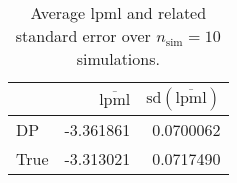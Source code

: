 \begin{table}[H]

\caption{Average lpml and related standard error over $n_{\text{sim}} = 10$ simulations.}
\centering
\begin{tabular}[t]{lrr}
\toprule
  & $\overbar{\text{lpml}}$ & $\text{sd}(\overbar{\text{lpml}})$\\
\midrule
DP & -3.361861 & 0.0700062\\
True & -3.313021 & 0.0717490\\
\bottomrule
\end{tabular}
\end{table}